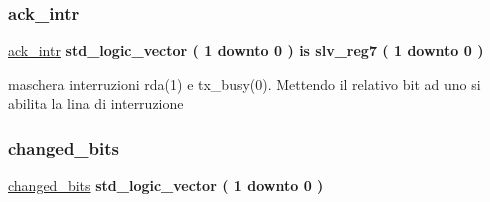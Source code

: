 \subsubsection{\texorpdfstring{ack\+\_\+intr}{ack\_intr}}
{\footnotesize\ttfamily \hyperlink{classUART__v1__0__S00__AXI_1_1arch__imp_a65e0e54a6d565935dd24ce96dbbce53a}{ack\+\_\+intr} {\bfseries \textcolor{vhdlchar}{std\+\_\+logic\+\_\+vector}\textcolor{vhdlchar}{ }\textcolor{vhdlchar}{(}\textcolor{vhdlchar}{ }\textcolor{vhdlchar}{ } \textcolor{vhdldigit}{1} \textcolor{vhdlchar}{ }\textcolor{vhdlchar}{downto}\textcolor{vhdlchar}{ }\textcolor{vhdlchar}{ } \textcolor{vhdldigit}{0} \textcolor{vhdlchar}{ }\textcolor{vhdlchar}{)}\textcolor{vhdlchar}{ }\textcolor{vhdlchar}{ }\textcolor{vhdlchar}{ }\textcolor{vhdlchar}{ }\textcolor{vhdlchar}{is}\textcolor{vhdlchar}{ }\textcolor{vhdlchar}{slv\+\_\+reg7}\textcolor{vhdlchar}{ }\textcolor{vhdlchar}{(}\textcolor{vhdlchar}{ }\textcolor{vhdlchar}{ } \textcolor{vhdldigit}{1} \textcolor{vhdlchar}{ }\textcolor{vhdlchar}{downto}\textcolor{vhdlchar}{ }\textcolor{vhdlchar}{ } \textcolor{vhdldigit}{0} \textcolor{vhdlchar}{ }\textcolor{vhdlchar}{)}\textcolor{vhdlchar}{ }} \hspace{0.3cm}{\ttfamily [Alias]}}

maschera interruzioni rda(1) e tx\+\_\+busy(0). Mettendo il relativo bit ad uno si abilita la lina di interruzione \mbox{\label{classUART__v1__0__S00__AXI_1_1arch__imp_a8b1599924c5da95abaa3e673fc0d2cb7}} 
\subsubsection{\texorpdfstring{changed\+\_\+bits}{changed\_bits}}
{\footnotesize\ttfamily \hyperlink{classUART__v1__0__S00__AXI_1_1arch__imp_a8b1599924c5da95abaa3e673fc0d2cb7}{changed\+\_\+bits} {\bfseries \textcolor{vhdlchar}{std\+\_\+logic\+\_\+vector}\textcolor{vhdlchar}{ }\textcolor{vhdlchar}{(}\textcolor{vhdlchar}{ }\textcolor{vhdlchar}{ } \textcolor{vhdldigit}{1} \textcolor{vhdlchar}{ }\textcolor{vhdlchar}{downto}\textcolor{vhdlchar}{ }\textcolor{vhdlchar}{ } \textcolor{vhdldigit}{0} \textcolor{vhdlchar}{ }\textcolor{vhdlchar}{)}\textcolor{vhdlchar}{ }} \hspace{0.3cm}{\ttfamily [Signal]}}

